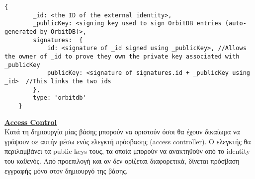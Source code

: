 \begin{lstlisting}[breaklines=true]
	{
		_id: <the ID of the external identity>,
		_publicKey: <signing key used to sign OrbitDB entries (auto-generated by OrbitDB)>,
		signatures:  {
			id: <signature of _id signed using _publicKey>,	//Allows the owner of _id to prove they own the private key associated with _publicKey
			publicKey: <signature of signatures.id + _publicKey using _id>	//This links the two ids
		},
		type: 'orbitdb'
	}
\end{lstlisting}

\underline{\textbf{Access Control}}\\
Κατά τη δημιουργία μίας βάσης μπορούν να οριστούν όσοι θα έχουν δικαίωμα να γράψουν σε αυτήν μέσω ενός ελεγκτή πρόσβασης (access controller). Ο ελεγκτής θα περιλαμβάνει τα public keys τους, τα οποία μπορούν να ανακτηθούν από το identity του καθενός. Από προεπιλογή και αν δεν ορίζεται διαφορετικά, δίνεται πρόσβαση εγγραφής μόνο στον δημιουργό της βάσης.
